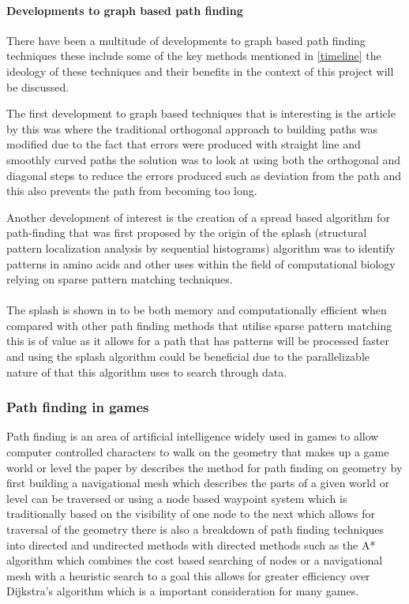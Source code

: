\paragraph{Developments to graph based path finding}
There have been a multitude of developments to graph based path finding techniques these include some of the key methods mentioned in \ref{timeline}  the ideology of these techniques and their benefits in the context of this project will be discussed.

The first development to graph based techniques that is interesting is the article by \cite{goodchild} this was where the traditional orthogonal approach to building paths was modified due to the fact that errors were produced with straight line and smoothly curved paths the solution was to look at using both the orthogonal and diagonal steps to reduce the errors produced such as deviation from the path and this also prevents the path from becoming too long.

Another development of interest is the creation of a spread based algorithm for path-finding that was first proposed by \cite{califano} the origin of the splash (structural pattern localization analysis by sequential histograms) algorithm was to identify patterns in amino acids and other uses within the field of computational biology relying on sparse pattern matching techniques.\\\\  The splash is shown in \cite{califano} to be both memory and computationally efficient when compared with other path finding methods that utilise sparse pattern matching this is of value as it allows for a path that has patterns will be processed faster and using the splash algorithm could be beneficial due to the parallelizable nature of that this algorithm uses to search through data.    


\subsubsection{Path finding in games}
\label{pfg}
Path finding is an area of artificial intelligence widely used in games to allow computer controlled characters to walk on the geometry that makes up a game world or level the paper by \cite{pathfinding-games} describes the method for path finding on geometry by first building a navigational mesh which describes the parts of a given world or level can be traversed or using a node based waypoint system which is traditionally based on the visibility of one node to the next which allows for traversal of the geometry there is also a breakdown of path finding techniques into directed and undirected methods with directed methods such as the A* algorithm which combines the cost based searching of nodes or a navigational mesh with a heuristic search to a goal this allows for greater efficiency over Dijkstra's algorithm which is a important consideration for many games.

